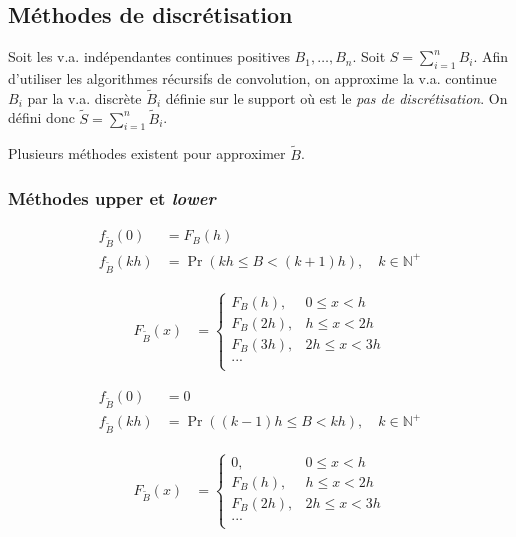\documentclass[10pt, french]{article}
\begin{document}
\begin{multicols*}{2}
\columnbreak
\subsection{Méthodes de discrétisation}
Soit les v.a. indépendantes continues positives $B_{1}, \dots, B_{n}$.
Soit $S	=	\sum_{i	=	1}^{n}B_{i}$.
Afin d'utiliser les algorithmes récursifs de convolution, on approxime la v.a. continue $B_{i}$ par la v.a. discrète $\tilde{B}_{i}$ définie sur le support  où  est le \textit{pas de discrétisation}.
On défini donc $\tilde{S}	=	\sum_{i	=	1}^{n}\tilde{B}_{i}$.

Plusieurs méthodes existent pour approximer $\tilde{B}$.


\subsubsection{Méthodes \textbf{upper} et \textit{lower}}
\begin{definitionNOHFILLprop}
\begin{align*}
	f_{\tilde{B}}(0)
	&=	F_{B}(h)	\\
	f_{\tilde{B}}(kh)
	&=	\Pr(kh	\leq	B	<	(k + 1)h), \quad k \in \mathbb{N}^{+}
\end{align*}

\begin{align*}
	F_{\tilde{B}}(x)
	&=	\begin{cases}
		F_{B}(h),	&	0	\leq	x	<	h	\\
		F_{B}(2h),	&	h	\leq	x	<	2h	\\
		F_{B}(3h),	&	2h	\leq	x	<	3h	\\
		...	&	\\
		\end{cases}
\end{align*}
\end{definitionNOHFILLprop}

\begin{definitionNOHFILLprop}
\begin{align*}
	f_{\tilde{B}}(0)
	&=	0	\\
	f_{\tilde{B}}(kh)
	&=	\Pr((k - 1)h	\leq	B	<	kh), \quad k \in \mathbb{N}^{+}
\end{align*}

\begin{align*}
	F_{\tilde{B}}(x)
	&=	\begin{cases}
		0,	&	0	\leq	x	<	h	\\
		F_{B}(h),	&	h	\leq	x	<	2h	\\
		F_{B}(2h),	&	2h	\leq	x	<	3h	\\
		...	&	\\
		\end{cases}
\end{align*}
\end{definitionNOHFILLprop}


\end{multicols*}
\end{document}
